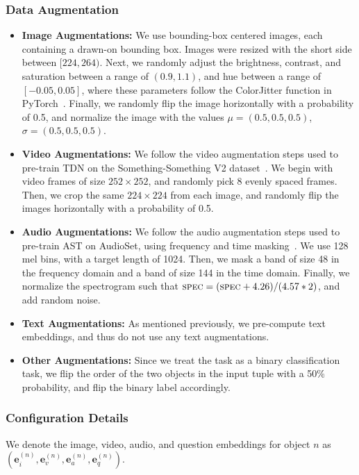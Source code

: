 \documentclass[runningheads]{llncs}
\begin{document}
\subsubsection{Data Augmentation}
\begin{itemize}
    \item \textbf{Image Augmentations:} We use bounding-box centered images, each containing a drawn-on bounding box. Images were resized with the short side between $[224, 264)$. Next, we randomly adjust the brightness, contrast, and saturation between a range of $(0.9, 1.1)$, and hue between a range of $[-0.05, 0.05]$, where these parameters follow the ColorJitter function in PyTorch~\cite{pytorch2019}. Finally, we randomly flip the image horizontally with a probability of 0.5, and normalize the image with the values $\mu = (0.5, 0.5, 0.5)$, $\sigma = (0.5,0.5,0.5)$.
    \item \textbf{Video Augmentations:} We follow the video augmentation steps used to pre-train TDN on the Something-Something V2 dataset~\cite{wang2021tdn}. We begin with video frames of size $252 \times 252$, and randomly pick 8 evenly spaced frames. Then, we crop the same $224 \times 224$ from each image, and randomly flip the images horizontally with a probability of 0.5. 
    \item \textbf{Audio Augmentations:} We follow the audio augmentation steps used to pre-train AST on AudioSet, using frequency and time masking~\cite{gong2021ast}. We use 128 mel bins, with a target length of 1024. Then, we mask a band of size 48 in the frequency domain and a band of size 144 in the time domain. Finally, we normalize the spectrogram such that $\textsc{spec} = (\textsc{spec}  + 4.26) / (4.57 * 2)$, and add random noise.
    \item \textbf{Text Augmentations:} As mentioned previously, we pre-compute text embeddings, and thus do not use any text augmentations.
    \item \textbf{Other Augmentations:} Since we treat the task as a binary classification task, we flip the order of the two objects in the input tuple with a 50\% probability, and flip the binary label accordingly. 
\end{itemize}

\subsubsection{Configuration Details}

We denote the image, video, audio, and question embeddings for object $n$ as $(\boldsymbol{e}_i^{(n)},\boldsymbol{e}_v^{(n)},\boldsymbol{e}_a^{(n)},\boldsymbol{e}_q^{(n)})$. 
\end{document}
